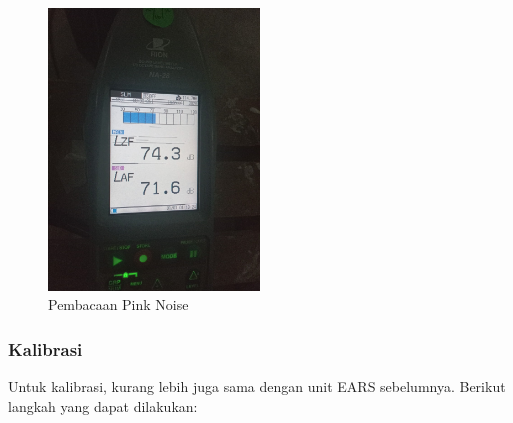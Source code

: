 \documentclass{article}
\begin{document}
\begin{itemize}
		\begin{figure}[H]
			\centering
			\includegraphics[width=0.5\textwidth,angle=0]{images/3dio_slm_pinknoise}
			\caption{Pembacaan Pink Noise}
		\end{figure}
	\end{itemize}

	\subsubsection{Kalibrasi}
	
	Untuk kalibrasi, kurang lebih juga sama dengan unit EARS sebelumnya.
	Berikut langkah yang dapat dilakukan:
	
\end{document}
